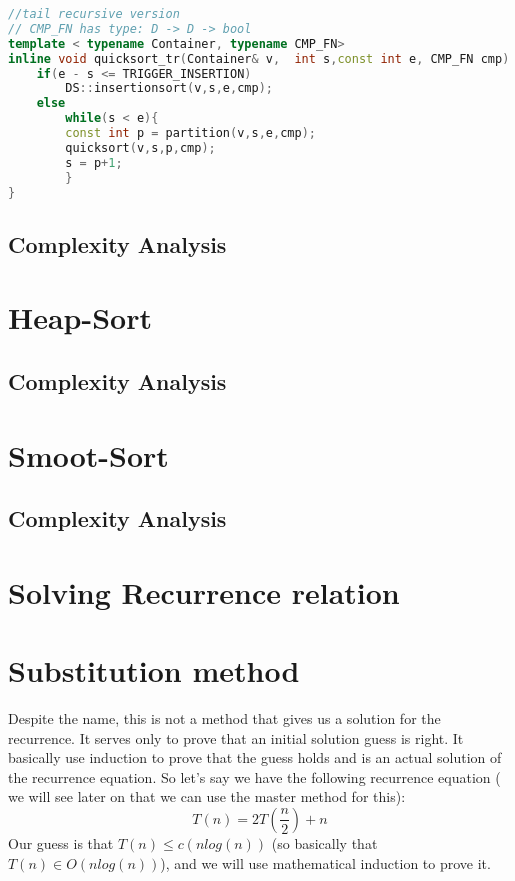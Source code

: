 \begin{lstlisting}[language=c++, caption="QuickSort Tail Recursive"]
//tail recursive version
// CMP_FN has type: D -> D -> bool
template < typename Container, typename CMP_FN>
inline void quicksort_tr(Container& v,  int s,const int e, CMP_FN cmp) {
    if(e - s <= TRIGGER_INSERTION)
        DS::insertionsort(v,s,e,cmp);
    else
        while(s < e){
        const int p = partition(v,s,e,cmp);
        quicksort(v,s,p,cmp);
        s = p+1;
        }
}
\end{lstlisting}


\subsection{Complexity Analysis}

\section{Heap-Sort}

\subsection{Complexity Analysis}

\section{Smoot-Sort}

\subsection{Complexity Analysis}


\section{Solving Recurrence relation}

\section{Substitution method}
\label{sec:substitutionmethod}
Despite the name, this is not a method that gives us a solution for the recurrence. It serves only to prove that an initial solution guess is right. It basically use induction to prove that the guess holds and is an actual solution of the recurrence equation.
So let's say we have the following recurrence equation ( we will see later on that we can use the master method for this):
\[T(n) = 2T(\frac{n}{2}) + n\]
Our guess is that $T(n) \leq c(nlog(n))$ (so basically that $T(n) \in O(nlog(n))$), and we will use mathematical induction to prove it.

